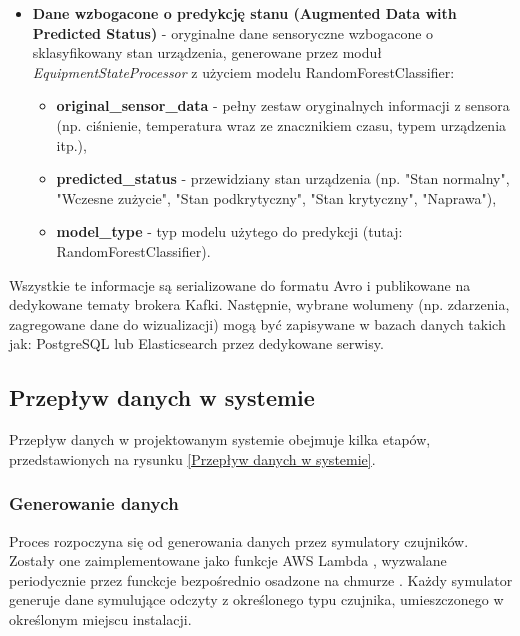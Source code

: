 \begin{itemize}
    \item \textbf{Dane wzbogacone o predykcję stanu (Augmented Data with Predicted Status)} - oryginalne dane sensoryczne wzbogacone o sklasyfikowany stan urządzenia, generowane przez moduł \textit{\mbox{EquipmentStateProcessor}} z użyciem modelu \mbox{RandomForestClassifier}:
    \begin{itemize}
        \item \textbf{original\_sensor\_data} - pełny zestaw oryginalnych informacji z sensora (np. ciśnienie, temperatura wraz ze znacznikiem czasu, typem urządzenia itp.),
        \item \textbf{predicted\_status} - przewidziany stan urządzenia (np. "Stan normalny", "Wczesne zużycie", "Stan podkrytyczny", "Stan krytyczny", "Naprawa"),
        \item \textbf{model\_type} - typ modelu użytego do predykcji (tutaj: \mbox{RandomForestClassifier}).
    \end{itemize}
\end{itemize}

\vspace{0.3em}

Wszystkie te informacje są serializowane do formatu Avro i publikowane na dedykowane tematy brokera Kafki. Następnie, wybrane wolumeny (np. zdarzenia, zagregowane dane do wizualizacji) mogą być zapisywane w bazach danych takich jak: PostgreSQL lub Elasticsearch przez dedykowane serwisy.

\newpage

\subsection{Przepływ danych w systemie}
\label{subsec:przeplyw_danych}

Przepływ danych w projektowanym systemie obejmuje kilka etapów, przedstawionych na rysunku \ref{Przepływ danych w systemie}.


\subsubsection{Generowanie danych}
\label{subsubsec:generowanie_danych}

Proces rozpoczyna się od generowania danych przez symulatory czujników. Zostały one zaimplementowane jako funkcje AWS Lambda \cite{aws_lambda_docs},
wyzwalane periodycznie przez funckcje bezpośrednio osadzone na chmurze  \cite{aws_step_functions_docs}.
Każdy symulator generuje dane symulujące odczyty z określonego typu czujnika,
umieszczonego w określonym miejscu instalacji.

